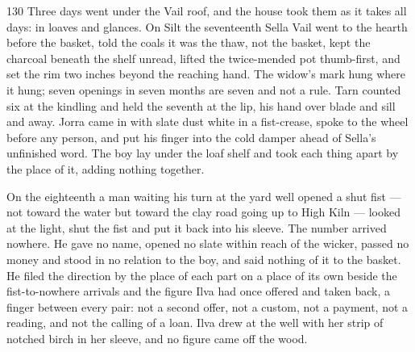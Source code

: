 
\scenebreak


\scenebreak


\scenebreak

\CRtailpiece
\begin{CRchronicle}{130}
Three days went under the Vail roof, and the house took them as it takes all days: in loaves and glances. On Silt the seventeenth Sella Vail went to the hearth before the basket, told the coals it was the thaw, not the basket, kept the charcoal beneath the shelf unread, lifted the twice-mended pot thumb-first, and set the rim two inches beyond the reaching hand. The widow’s mark hung where it hung; seven openings in seven months are seven and not a rule. Tarn counted six at the kindling and held the seventh at the lip, his hand over blade and sill and away. Jorra came in with slate dust white in a fist-crease, spoke to the wheel before any person, and put his finger into the cold damper ahead of Sella’s unfinished word. The boy lay under the loaf shelf and took each thing apart by the place of it, adding nothing together.

On the eighteenth a man waiting his turn at the yard well opened a shut fist — not toward the water but toward the clay road going up to High Kiln — looked at the light, shut the fist and put it back into his sleeve. The number arrived nowhere. He gave no name, opened no slate within reach of the wicker, passed no money and stood in no relation to the boy, and said nothing of it to the basket. He filed the direction by the place of each part on a place of its own beside the fist-to-nowhere arrivals and the figure Ilva had once offered and taken back, a finger between every pair: not a second offer, not a custom, not a payment, not a reading, and not the calling of a loan. Ilva drew at the well with her strip of notched birch in her sleeve, and no figure came off the wood.


\end{CRchronicle}
